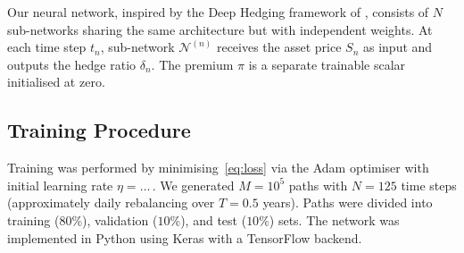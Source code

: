 Our neural network, inspired by the Deep Hedging framework of \citet{BuehlerEtAl2019},
consists of $N$ sub-networks sharing the same architecture but with independent weights.
At each time step $t_n$, sub-network $\mathcal{N}^{(n)}$ receives the asset price $S_n$
as input and outputs the hedge ratio $\delta_n$. The premium $\pi$ is a separate
trainable scalar initialised at zero.


\subsection{Training Procedure}
\label{subsec:training}


Training was performed by minimising~\eqref{eq:loss} via the Adam optimiser
\citep{KingmaBa2015} with initial learning rate $\eta = \ldots\,$. We generated
$M = 10^5$ paths with $N = 125$ time steps (approximately daily rebalancing over
$T = 0.5$ years). Paths were divided into training ($80\%$), validation ($10\%$),
and test ($10\%$) sets. The network was implemented in Python using Keras
\citep{Chollet2026} with a TensorFlow backend.
